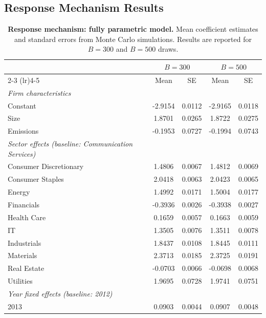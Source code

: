 \documentclass[a4paper,12pt]{article}
\begin{document}
\clearpage

\subsection{Response Mechanism Results}

\begin{table}[htbp]
\footnotesize
\centering
\caption{\textbf{Response mechanism: fully parametric model.}
Mean coefficient estimates and standard errors from Monte Carlo simulations.
Results are reported for $B=300$ and $B=500$ draws.}
\label{tab:results_LM}

\begin{tabular}{lcccc}
\toprule
 & \multicolumn{2}{c}{$B=300$} & \multicolumn{2}{c}{$B=500$} \\
\cmidrule(lr){2-3} \cmidrule(lr){4-5}
 & Mean & SE & Mean & SE \\
\midrule
\textit{Firm characteristics} \\
Constant   & -2.9154 & 0.0112 & -2.9165 & 0.0118 \\
Size       &  1.8701 & 0.0265 &  1.8722 & 0.0275 \\
Emissions  & -0.1953 & 0.0727 & -0.1994 & 0.0743 \\
\midrule
\textit{Sector effects (baseline: Communication Services)} \\
Consumer Discretionary &  1.4806 & 0.0067 &  1.4812 & 0.0069 \\
Consumer Staples       &  2.0418 & 0.0063 &  2.0423 & 0.0065 \\
Energy                 &  1.4992 & 0.0171 &  1.5004 & 0.0177 \\
Financials             & -0.3936 & 0.0026 & -0.3938 & 0.0027 \\
Health Care            &  0.1659 & 0.0057 &  0.1663 & 0.0059 \\
IT                     &  1.3505 & 0.0076 &  1.3511 & 0.0078 \\
Industrials            &  1.8437 & 0.0108 &  1.8445 & 0.0111 \\
Materials              &  2.3713 & 0.0185 &  2.3725 & 0.0191 \\
Real Estate            & -0.0703 & 0.0066 & -0.0698 & 0.0068 \\
Utilities              &  1.9695 & 0.0728 &  1.9741 & 0.0751 \\
\midrule
\textit{Year fixed effects (baseline: 2012)} \\
2013 & 0.0903 & 0.0044 & 0.0907 & 0.0048 \\

\end{tabular}
\end{table}
\end{document}
